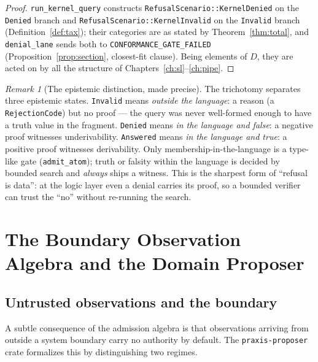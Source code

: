 \documentclass[11pt,oneside]{book}
\theoremstyle{definition}
\theoremstyle{plain}
\theoremstyle{remark}
\newtheorem*{remark}{Remark}
\newcommand{\code}[1]{\texttt{#1}}
\newcommand{\Deny}{D}                 %
\begin{document}
\begin{proof}
\code{run\_kernel\_query} constructs \code{RefusalScenario::KernelDenied} on the \code{Denied} branch and \code{RefusalScenario::KernelInvalid} on the \code{Invalid} branch (Definition~\ref{def:tax}); their categories are as stated by Theorem~\ref{thm:total}, and \code{denial\_lane} sends both to \code{CONFORMANCE\_GATE\_FAILED} (Proposition~\ref{prop:section}, closest-fit clause). %
Being elements of $\Deny$, they are acted on by all the structure of Chapters~\ref{ch:sl}--\ref{ch:pipe}. %
\end{proof}

\begin{remark}[The epistemic distinction, made precise]
The trichotomy separates three epistemic states. %
\code{Invalid} means \emph{outside the language}: a reason (a \code{RejectionCode}) but no proof --- the query was never well-formed enough to have a truth value in the fragment. %
\code{Denied} means \emph{in the language and false}: a negative proof witnesses underivability. %
\code{Answered} means \emph{in the language and true}: a positive proof witnesses derivability. %
Only membership-in-the-language is a type-like gate (\code{admit\_atom}); truth or falsity within the language is decided by bounded search and \emph{always} ships a witness. %
This is the sharpest form of ``refusal is data'': at the logic layer even a denial carries its proof, so a bounded verifier can trust the ``no'' without re-running the search. %
\end{remark}

\chapter{The Boundary Observation Algebra and the Domain Proposer}
\label{ch:proposer}

\section{Untrusted observations and the boundary}

A subtle consequence of the admission algebra is that observations arriving from outside a system boundary carry no authority by default. %
The \code{praxis-proposer} crate formalizes this by distinguishing two regimes. %
\end{document}
